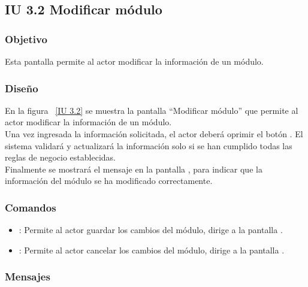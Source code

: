 \subsection{IU 3.2 Modificar módulo}

\subsubsection{Objetivo}
	
    Esta pantalla permite al actor modificar la información de un módulo.

\subsubsection{Diseño}

    En la figura ~\ref{IU 3.2} se muestra la pantalla ``Modificar módulo'' que permite al actor modificar la información de un módulo. \\
    
    Una vez ingresada la información solicitada, el actor deberá oprimir el botón . El sistema validará y actualizará la 
    información solo si se han cumplido todas las reglas de negocio establecidas.  \\
    
    Finalmente se mostrará el mensaje  en la pantalla , 
    para indicar que la información del módulo
    se ha modificado correctamente.        



\subsubsection{Comandos}
\begin{itemize}
	\item {}: Permite al actor guardar los cambios del módulo, dirige a la pantalla .
	\item {}: Permite al actor cancelar los cambios del módulo, dirige a la pantalla .
\end{itemize}

\subsubsection{Mensajes}
	
